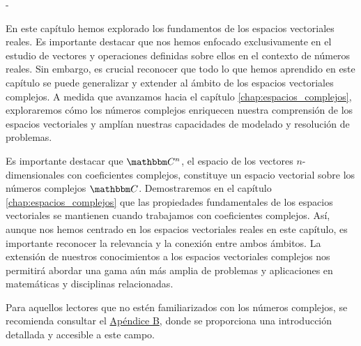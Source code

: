 \begin{adjustwidth}{-2.15cm}{-\wholeMargin -3.5cm}
    \begin{tcolorbox}[
        theorem style=change break,
        enhanced,
        breakable,
        boxrule=0pt,
        frame hidden,
        left = 2cm,
        right = 2cm,
        top=1mm,
        bottom=1mm,
        colback=gray!20,
        coltitle=black,
        sharp corners,
        fonttitle=\bfseries\large,
        fontupper=\normalsize
    ]
        \begin{multicols}{2}
            \hspace*{5.5mm}En este capítulo hemos explorado los fundamentos de los espacios vectoriales reales. Es importante destacar que nos hemos enfocado exclusivamente en el estudio de vectores y operaciones definidas sobre ellos en el contexto de números reales. Sin embargo, es crucial reconocer que todo lo que hemos aprendido en este capítulo se puede generalizar y extender al ámbito de los espacios vectoriales complejos. A medida que avanzamos hacia el capítulo \ref{chap:espacios_complejos}, exploraremos cómo los números complejos enriquecen nuestra comprensión de los espacios vectoriales y amplían nuestras capacidades de modelado y resolución de problemas.
            
            \hspace*{5.5mm}Es importante destacar que $\CC[n]$, el espacio de los vectores $n$-dimensionales con coeficientes complejos, constituye un espacio vectorial sobre los números complejos $\CC$. Demostraremos en el capítulo \ref{chap:espacios_complejos} que las propiedades fundamentales de los espacios vectoriales se mantienen cuando trabajamos con coeficientes complejos. Así, aunque nos hemos centrado en los espacios vectoriales reales en este capítulo, es importante reconocer la relevancia y la conexión entre ambos ámbitos. La extensión de nuestros conocimientos a los espacios vectoriales complejos nos permitirá abordar una gama aún más amplia de problemas y aplicaciones en matemáticas y disciplinas relacionadas.
            
            \hspace*{5.5mm}Para aquellos lectores que no estén familiarizados con los números complejos, se recomienda consultar el \hyperref[chap:numeros-complejos]{Apéndice B}, donde se proporciona una introducción detallada y accesible a este campo. %
        \end{multicols}
    \end{tcolorbox}
\end{adjustwidth}


